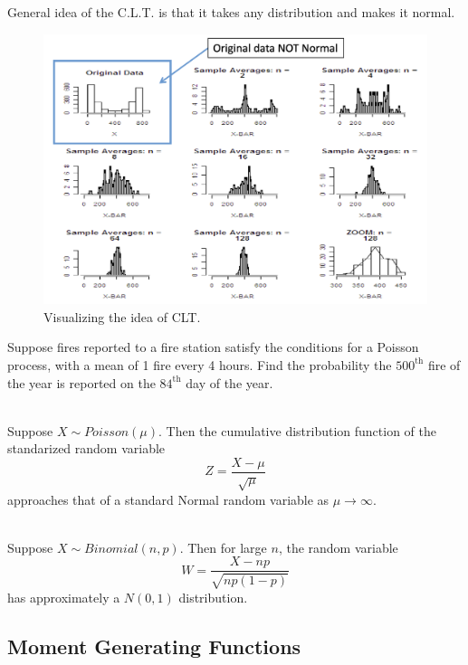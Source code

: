 General idea of the C.L.T. is that it takes any distribution and makes it normal.
\begin{figure}[htbp]
    \center
    \includegraphics[scale=0.5]{img/CLT-ex.png}
    \caption{Visualizing the idea of CLT.}
\end{figure}

\begin{example}
    Suppose fires reported to a fire station satisfy the conditions for a Poisson process, with a mean of 1 fire every 4 hours. Find the probability the $500^{\text{th}}$ fire of the year is reported on the $84^{\text{th}}$ day of the year.

\end{example}

\begin{theorem}
    \phantom{}  \\
    Suppose $X \sim Poisson(\mu)$. Then the cumulative distribution function of the standarized
    random variable
    \[Z = \frac{X - \mu}{\sqrt{\mu}}\]
    approaches that of a standard Normal random variable as $\mu \to \infty$.
\end{theorem}

\begin{theorem}
    \phantom{}  \\
    Suppose $X \sim Binomial(n, p)$. Then for large $n$, the random variable
    \[W = \frac{X - np}{\sqrt{np(1 - p)}}\]
    has approximately a $N(0, 1)$ distribution.
\end{theorem}


\subsection{Moment Generating Functions}

